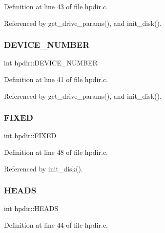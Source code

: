Definition at line 43 of file hpdir.\+c.



Referenced by get\+\_\+drive\+\_\+params(), and init\+\_\+disk().

\mbox{\label{structhpdir_a1e3e614e8f323bb5087945ba70beb16f}} 
\subsubsection{\texorpdfstring{D\+E\+V\+I\+C\+E\+\_\+\+N\+U\+M\+B\+ER}{DEVICE\_NUMBER}}
{\footnotesize\ttfamily int hpdir\+::\+D\+E\+V\+I\+C\+E\+\_\+\+N\+U\+M\+B\+ER}



Definition at line 41 of file hpdir.\+c.



Referenced by get\+\_\+drive\+\_\+params(), and init\+\_\+disk().

\mbox{\label{structhpdir_ac3e0a6afce05a177e54f95b071924088}} 
\subsubsection{\texorpdfstring{F\+I\+X\+ED}{FIXED}}
{\footnotesize\ttfamily int hpdir\+::\+F\+I\+X\+ED}



Definition at line 48 of file hpdir.\+c.



Referenced by init\+\_\+disk().

\mbox{\label{structhpdir_a7c12d4945c875e4830fe6197e6e9458b}} 
\subsubsection{\texorpdfstring{H\+E\+A\+DS}{HEADS}}
{\footnotesize\ttfamily int hpdir\+::\+H\+E\+A\+DS}



Definition at line 44 of file hpdir.\+c.



